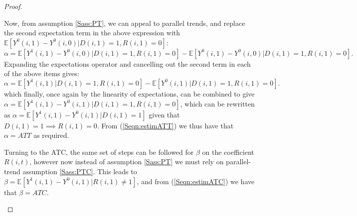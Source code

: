 \begin{proof}
\begin{footnotesize}
Now, from assumption \ref{Sass:PT}, we can appeal to parallel trends, and replace
the second expectation term in the above expression with $\mathbb{E}[Y^0(i,1)-
Y^0(i,0)|D(i,1)=1,R(i,1)=0]$:
\begin{equation}
\nonumber
\label{Seqn:alphaProof4}
\alpha=\mathbb{E}[Y^1(i,1)-Y^0(i,0)|D(i,1)=1,R(i,1)=0] - \mathbb{E}[Y^0(i,1)-Y^0(i,0)|D(i,1)=1,R(i,1)=0].
\end{equation}
Expanding the expectations operator and cancelling out the second term in each of
the above items gives:
\begin{equation}
\nonumber
\label{Seqn:alphaProof5}
\alpha=\mathbb{E}[Y^1(i,1)|D(i,1)=1,R(i,1)=0] - \mathbb{E}[Y^0(i,1)|D(i,1)=1,R(i,1)=0].
\end{equation}
which finally, once again by the linearity of expectations, can be combined to give
$\alpha=\mathbb{E}[Y^1(i,1)-Y^0(i,1)|D(i,1)=1,R(i,1)=0]$, which can be rewritten as
$\alpha=\mathbb{E}[Y^1(i,1)-Y^0(i,1)|D(i,1)=1]$ given that $D(i,1)=1 \implies R(i,1)=0$.  
From (\ref{Seqn:estimATT}) we thus have that $\alpha=ATT$ as required.

Turning to the ATC, the same set of steps can be followed for $\beta$ on the 
coefficient $R(i,t)$, however now instead of assumption \ref{Sass:PT} we must
rely on parallel-trend assumption \ref{Sass:PTC}. This leads to 
$\beta=\mathbb{E}[Y^1(i,1)-Y^0(i,1)|R(i,1)\neq 1]$, and from (\ref{Seqn:estimATC}) 
we have that $\beta=ATC$.

\end{footnotesize}
\end{proof}








